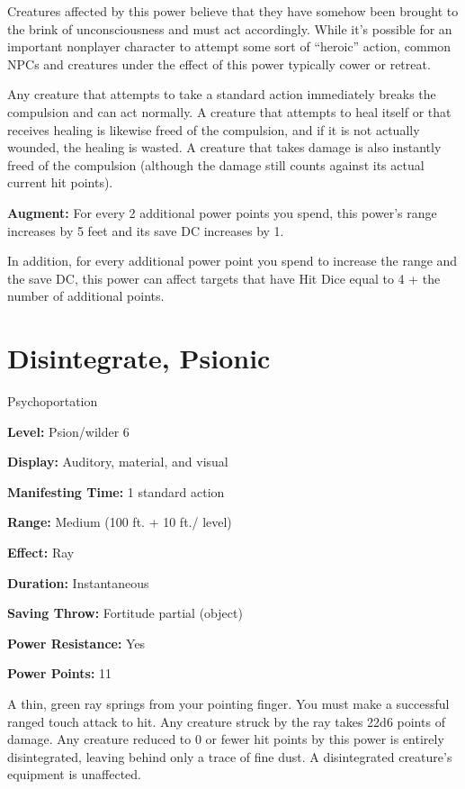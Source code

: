 \documentclass{article}
\begin{document}
Creatures affected by this power believe that they have somehow been brought to 
the brink of unconsciousness and must act accordingly. While it's possible for 
an important nonplayer character to attempt some sort of ``heroic'' action, common 
NPCs and creatures under the effect of this power typically cower or retreat.

Any creature that attempts to take a standard action immediately breaks the compulsion 
and can act normally. A creature that attempts to heal itself or that receives 
healing is likewise freed of the compulsion, and if it is not actually wounded, 
the healing is wasted. A creature that takes damage is also instantly freed of 
the compulsion (although the damage still counts against its actual current hit 
points).

\textbf{Augment:} For every 2 additional power points you spend, this power's range 
increases by 5 feet and its save DC increases by 1.

In addition, for every additional power point you spend to increase the range and 
the save DC, this power can affect targets that have Hit Dice equal to 4 + the 
number of additional points.

\vspace{12pt}
\section*{Disintegrate, Psionic}

Psychoportation

\textbf{Level:} Psion/wilder 6

\textbf{Display:} Auditory, material, and visual

\textbf{Manifesting Time:} 1 standard action

\textbf{Range:} Medium (100 ft. + 10 ft./ level)

\textbf{Effect:} Ray

\textbf{Duration:} Instantaneous

\textbf{Saving Throw:} Fortitude partial (object)

\textbf{Power Resistance:} Yes

\textbf{Power Points:} 11

A thin, green ray springs from your pointing finger. You must make a successful 
ranged touch attack to hit. Any creature struck by the ray takes 22d6 points of 
damage. Any creature reduced to 0 or fewer hit points by this power is entirely 
disintegrated, leaving behind only a trace of fine dust. A disintegrated creature's 
equipment is unaffected.
\end{document}
